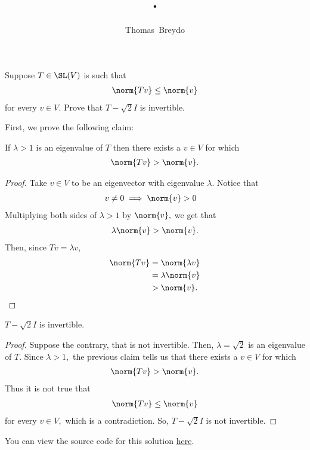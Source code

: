 \documentclass{amsart}
\title{\pagenum.\probnum}
\author{Thomas\ Breydo}
\newcommand{\pagenum}{175}
\newcommand{\probnum}{5}
\begin{document}
\maketitle

\begin{problem*}
Suppose $T\in\SL(V)$ is such that
\begin{align*}
    \norm{Tv}\le\norm{v}
\end{align*}
for every $v\in V.$ Prove that $T-\sqrt2I$ is invertible.
\end{problem*}

\vspace{0.5in}

First, we prove the following claim:

\begin{claim*}
If $\lambda>1$ is an eigenvalue of $T$ then there exists a $v\in V$ for which
\begin{align*}
    \norm{Tv}>\norm{v}.
\end{align*}
\end{claim*}
\begin{proof}
Take $v\in V$ to be an eigenvector with eigenvalue $\lambda.$ Notice that
\begin{align*}
    v\ne0 &\implies \norm{v}>0
\end{align*}
Multiplying both sides of $\lambda>1$ by $\norm{v},$ we get that
\begin{align*}
    \lambda\norm{v} > \norm{v}.
\end{align*}
Then, since $Tv=\lambda v,$
\begin{align*}
    \norm{Tv} &= \norm{\lambda v} \\
              &= \lambda\norm{v} \\
              &> \norm{v}.\qedhere
\end{align*}
\end{proof}

\begin{claim*}
    $T-\sqrt2I$ is invertible.
\end{claim*}
\begin{proof}
Suppose the contrary, that is not invertible.
Then, $\lambda=\sqrt2$ is an eigenvalue
of $T.$ Since $\lambda>1,$ the previous claim tells us that
there exists a $v\in V$ for which
\begin{align*}
    \norm{Tv}>\norm{v}.
\end{align*}
Thus it is not true that
\begin{align*}
    \norm{Tv}\le\norm{v}
\end{align*}
for every $v\in V,$ which is a contradiction.
So, $T-\sqrt2I$ is not invertible.
\end{proof}

\vspace{0.5in}

\begin{note*}
You can view the source code for this solution
\href{https://github.com/thomasbreydo/linalg/blob/main/\pagenum_\probnum_Thomas_Breydo.tex}
{here}.
\end{note*}
\end{document}
